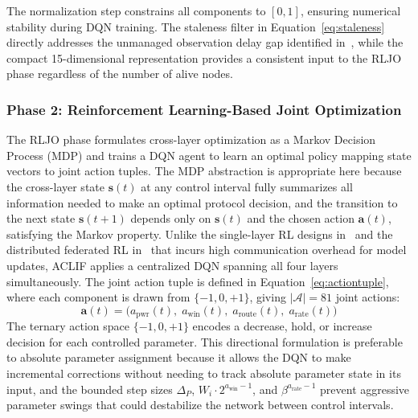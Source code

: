\documentclass[a4paper]{cas-dc}
\numberwithin{equation}{section}
\begin{document}
The normalization step constrains all components to $[0,1]$, ensuring numerical stability during DQN training. The staleness filter in Equation~\ref{eq:staleness} directly addresses the unmanaged observation delay gap identified in~\cite{Hu2025}, while the compact 15-dimensional representation provides a consistent input to the RLJO phase regardless of the number of alive nodes.

\subsubsection{Phase 2: Reinforcement Learning-Based Joint Optimization}
\label{subsubsec:phase2}

The RLJO phase formulates cross-layer optimization as a Markov Decision Process (MDP) and trains a DQN agent to learn an optimal policy mapping state vectors to joint action tuples. The MDP abstraction is appropriate here because the cross-layer state $\mathbf{s}(t)$ at any control interval fully summarizes all information needed to make an optimal protocol decision, and the transition to the next state $\mathbf{s}(t+1)$ depends only on $\mathbf{s}(t)$ and the chosen action $\mathbf{a}(t)$, satisfying the Markov property. Unlike the single-layer RL designs in~\cite{Serra2025,Musaddiq20201} and the distributed federated RL in~\cite{Suresh2024} that incurs high communication overhead for model updates, ACLIF applies a centralized DQN spanning all four layers simultaneously. The joint action tuple is defined in Equation~\ref{eq:actiontuple}, where each component is drawn from $\{-1,0,+1\}$, giving $|\mathcal{A}|=81$ joint actions:
\begin{equation}
\label{eq:actiontuple}
\mathbf{a}(t) = \bigl(a_{\text{pwr}}(t),\;a_{\text{win}}(t),\;a_{\text{route}}(t),\;a_{\text{rate}}(t)\bigr)
\end{equation}
The ternary action space $\{-1,0,+1\}$ encodes a decrease, hold, or increase decision for each controlled parameter. This directional formulation is preferable to absolute parameter assignment because it allows the DQN to make incremental corrections without needing to track absolute parameter state in its input, and the bounded step sizes $\Delta_P$, $W_i\cdot 2^{a_{\text{win}}-1}$, and $\beta^{a_{\text{rate}}-1}$ prevent aggressive parameter swings that could destabilize the network between control intervals.
\end{document}
